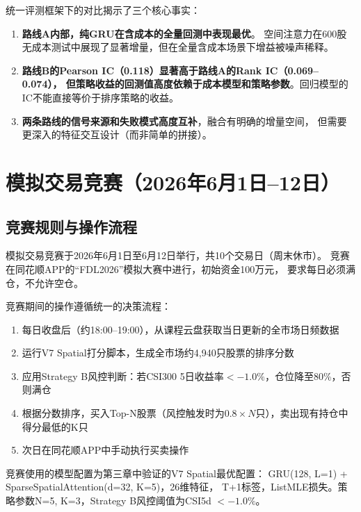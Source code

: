 \documentclass[12pt,a4paper]{ctexart}
\begin{document}
统一评测框架下的对比揭示了三个核心事实：

\begin{enumerate}[leftmargin=*]
    \item \textbf{路线A内部，纯GRU在含成本的全量回测中表现最优}。
          空间注意力在600股无成本测试中展现了显著增量，但在全量含成本场景下增益被噪声稀释。
    \item \textbf{路线B的Pearson IC（0.118）显著高于路线A的Rank IC（0.069--0.074），
          但策略收益的回测值高度依赖于成本模型和策略参数}。回归模型的IC不能直接等价于排序策略的收益。
    \item \textbf{两条路线的信号来源和失败模式高度互补}，融合有明确的增量空间，
          但需要更深入的特征交互设计（而非简单的拼接）。
\end{enumerate}

\section{模拟交易竞赛（2026年6月1日--12日）}

\subsection{竞赛规则与操作流程}

模拟交易竞赛于2026年6月1日至6月12日举行，共10个交易日（周末休市）。
竞赛在同花顺APP的“FDL2026”模拟大赛中进行，初始资金100万元，
要求每日必须满仓，不允许空仓。

竞赛期间的操作遵循统一的决策流程：
\begin{enumerate}[leftmargin=*]
    \item 每日收盘后（约18:00--19:00），从课程云盘获取当日更新的全市场日频数据
    \item 运行V7 Spatial打分脚本，生成全市场约4,940只股票的排序分数
    \item 应用Strategy B风控判断：若CSI300 5日收益率$< -1.0\%$，仓位降至80\%，否则满仓
    \item 根据分数排序，买入Top-N股票（风控触发时为$0.8\times N$只），卖出现有持仓中得分最低的K只
    \item 次日在同花顺APP中手动执行买卖操作
\end{enumerate}

竞赛使用的模型配置为第三章中验证的V7 Spatial最优配置：
GRU(128, L=1) + SparseSpatialAttention(d=32, K=5)，26维特征，
T+1标签，ListMLE损失。策略参数N=5, K=3，Strategy B风控阈值为CSI5d $< -1.0\%$。
\end{document}
